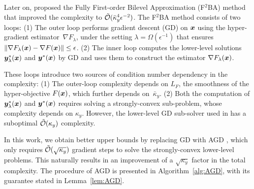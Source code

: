 \documentclass{article}
\begin{document}
Later on, \citet{chen2023near} proposed the Fully First-order Bilevel Approximation (F${}^2$BA) method that improved the complexity to 
$\tilde {{\mathcal{O}}}(\bar \kappa_y^4 \epsilon^{-2})$. The F${}^2$BA method consists of two loops:
(1) The outer loop performs gradient descent (GD) on ${\bm{x}}$ using the hyper-gradient estimator~$\nabla F_\lambda$, under the setting $\lambda = \Omega(\epsilon^{-1})$ that ensures  $\Vert \nabla F_\lambda({\bm{x}}) - \nabla F({\bm{x}}) \Vert \le \epsilon$. (2) The inner loop computes the lower-level solutions ${\bm{y}}_{\lambda}^*({\bm{x}})$ and ${\bm{y}}^*({\bm{x}})$ by GD and uses them to construct the estimator $\nabla F_\lambda({\bm{x}})$. 

These loops introduce two sources of condition number dependency in the complexity: (1) The outer-loop complexity depends on $L_F$, the smoothness of the hyper-objective $F({\bm{x}})$, which further depends on~$\bar \kappa_y$. (2) Both the computation of ${\bm{y}}_{\lambda}^*({\bm{x}})$ and ${\bm{y}}^*({\bm{x}})$ requires solving a strongly-convex sub-problem, whose complexity depends on $\kappa_y$. However, the lower-level GD sub-solver used in \citep{chen2023near} has a suboptimal $\tilde {{\mathcal{O}}}(\kappa_y)$ complexity.

In this work, we obtain better upper bounds by replacing GD with AGD \citep{nesterov1983method}, which only requires  $\tilde {{\mathcal{O}}}(\sqrt{\kappa_y})$ gradient steps to solve the strongly-convex lower-level problems. This naturally results in an improvement of a $\sqrt{\kappa_y}$ factor in the total complexity. The procedure of AGD is presented in Algorithm~\ref{alg:AGD}, with its guarantee stated in Lemma~\ref{lem:AGD}.

\end{document}

